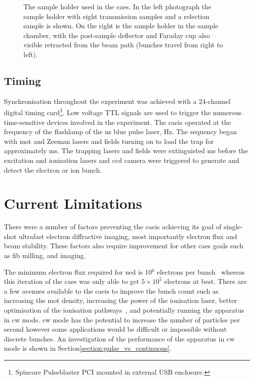 \begin{figure}
\begin{subfigure}{0.49\linewidth}
    \end{subfigure}
    \caption{The sample holder used in the \gls{caes}. In the left photograph the sample holder with eight transmission samples and a relection sample is shown. On the right is the sample holder in the sample chamber, with the post-sample deflector and Faraday cup also visible retracted from the beam path (bunches travel from right to left).}
    \label{figure:sample_holder}
\end{figure}

\subsection{Timing}\label{section:pulse_blaster}

Synchronisation throughout the experiment was achieved with a 24-channel digital timing card\footnote{Spincore Pulseblaster PCI mounted in external USB enclosure.}.
Low voltage TTL signals are used to trigger the numerous time-sensitive devices involved in the experiment.
The \gls{caeis} operated at the frequency of the flashlamp of the \unit[5]{ns} blue pulse laser, \unit[10]{Hz}.
The sequency began with \gls{mot} and Zeeman lasers and fields turning on to load the trap for approximately \unit[90]{ms}.
The trapping lasers and fields were extinguisted \unit[5]{ms} before the excitation and ionisation lasers and \gls{ccd} camera were triggered to generate and detect the electron or ion bunch.

\section{Current Limitations}

There were a number of factors preventing the \gls{caeis} achieving its goal of single-shot ultrafast electron diffractive imaging, most importantly electron flux and beam stability.
These factors also require improvement for other \gls{caes} goals such as \gls{fib} milling, and imaging.

The minimum electron flux required for \gls{ued} is 10$^6$ electrons per bunch~\cite{van_oudheusden_compression_2010} whereas this iteration of the \gls{caes} was only able to get $5\times10^5$ electrons at best.
There are a few avenues available to the \gls{caeis} to improve the bunch count such as increasing the \gls{mot} density, increasing the power of the ionisation laser, better optimisation of the ionisation pathways~\cite{mcculloch_field_2017}, and potentially running the apparatus in \gls{cw} mode.
\Gls{cw} mode  has the potential to increase the number of particles per second however some applications would be difficult or impossible without discrete bunches.
An investigation of the performance of the apparatus in \gls{cw} mode is shown in Section\ref{section:pulse_vs_continuous}.


